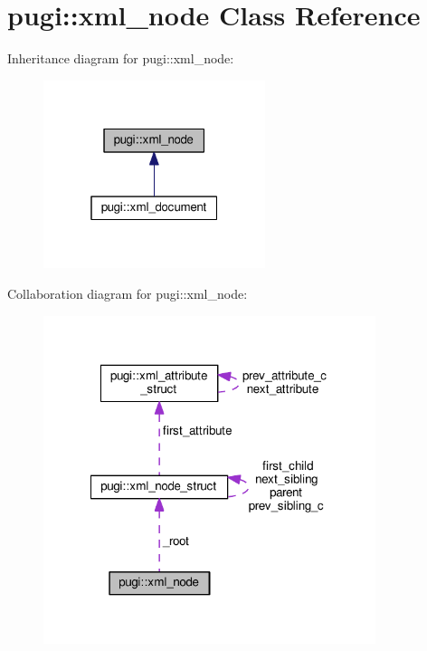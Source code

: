 \hypertarget{classpugi_1_1xml__node}{\section{pugi\+:\+:xml\+\_\+node Class Reference}
\label{classpugi_1_1xml__node}
}


Inheritance diagram for pugi\+:\+:xml\+\_\+node\+:
\nopagebreak
\begin{figure}[H]
\begin{center}
\leavevmode
\includegraphics[width=184pt]{classpugi_1_1xml__node__inherit__graph}
\end{center}
\end{figure}


Collaboration diagram for pugi\+:\+:xml\+\_\+node\+:
\nopagebreak
\begin{figure}[H]
\begin{center}
\leavevmode
\includegraphics[width=275pt]{classpugi_1_1xml__node__coll__graph}
\end{center}
\end{figure}
